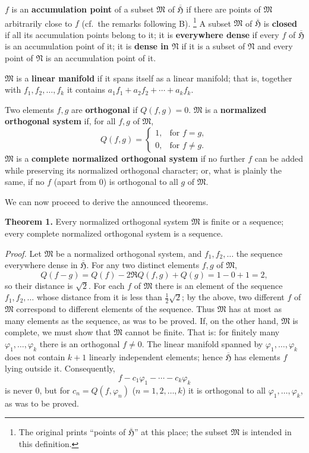 \documentclass[fontsize=13pt,paper=b5,twoside,bookmarkpackage=false]{scrartcl}
\newcounter{translatornote}
\newcommand{\tnote}[1]{%
  \begingroup\stepcounter{translatornote}%
  \renewcommand{\thefootnote}{T\arabic{translatornote}}%
  \footnote[0]{#1}\endgroup}
\begin{document}
$f$ is an \textbf{accumulation point} of a subset $\mathfrak{M}$ of $\overline{\mathfrak{H}}$ if there are points of $\mathfrak{M}$ arbitrarily close to $f$ (cf.\ the remarks following B).\tnote{The original prints ``points of $\overline{\mathfrak{H}}$'' at this place; the subset $\mathfrak{M}$ is intended in this definition.} A subset $\mathfrak{M}$ of $\overline{\mathfrak{H}}$ is \textbf{closed} if all its accumulation points belong to it; it is \textbf{everywhere dense} if every $f$ of $\overline{\mathfrak{H}}$ is an accumulation point of it; it is \textbf{dense in $\mathfrak{N}$} if it is a subset of $\mathfrak{N}$ and every point of $\mathfrak{N}$ is an accumulation point of it.

$\mathfrak{M}$ is a \textbf{linear manifold} if it spans itself as a linear manifold; that is, together with $f_1,f_2,\ldots,f_k$ it contains $a_1f_1+a_2f_2+\cdots+a_kf_k$.

Two elements $f,g$ are \textbf{orthogonal} if $Q(f,g)=0$. $\mathfrak{M}$ is a \textbf{normalized orthogonal system} if, for all $f,g$ of $\mathfrak{M}$,
\[
Q(f,g)=\begin{cases}
1,&\text{for }f=g,\\
0,&\text{for }f\ne g.
\end{cases}
\]
$\mathfrak{M}$ is a \textbf{complete normalized orthogonal system} if no further $f$ can be added while preserving its normalized orthogonal character; or, what is plainly the same, if no $f$ (apart from $0$) is orthogonal to all $g$ of $\mathfrak{M}$.

We can now proceed to derive the announced theorems.

\par\medskip\noindent\textbf{Theorem 1.}\label{thm:VI:1}
Every normalized orthogonal system $\mathfrak{M}$ is finite or a sequence; every complete normalized orthogonal system is a sequence.

\par\noindent\textit{Proof.}
Let $\mathfrak{M}$ be a normalized orthogonal system, and $f_1,f_2,\ldots$ the sequence everywhere dense in $\overline{\mathfrak{H}}$. For any two distinct elements $f,g$ of $\mathfrak{M}$,
\[
Q(f-g)=Q(f)-2\Re Q(f,g)+Q(g)=1-0+1=2,
\]
so their distance is $\sqrt{2}$. For each $f$ of $\mathfrak{M}$ there is an element of the sequence $f_1,f_2,\ldots$ whose distance from it is less than $\tfrac12\sqrt{2}$; by the above, two different $f$ of $\mathfrak{M}$ correspond to different elements of the sequence. Thus $\mathfrak{M}$ has at most as many elements as the sequence, as was to be proved. If, on the other hand, $\mathfrak{M}$ is complete, we must show that $\mathfrak{M}$ cannot be finite. That is: for finitely many $\varphi_1,\ldots,\varphi_k$ there is an orthogonal $f\ne0$. The linear manifold spanned by $\varphi_1,\ldots,\varphi_k$ does not contain $k+1$ linearly independent elements; hence $\overline{\mathfrak{H}}$ has elements $f$ lying outside it. Consequently,
\[
f-c_1\varphi_1-\cdots-c_k\varphi_k
\]
is never $0$, but for $c_n=Q(f,\varphi_n)$ ($n=1,2,\ldots,k$) it is orthogonal to all $\varphi_1,\ldots,\varphi_k$, as was to be proved.
\end{document}
